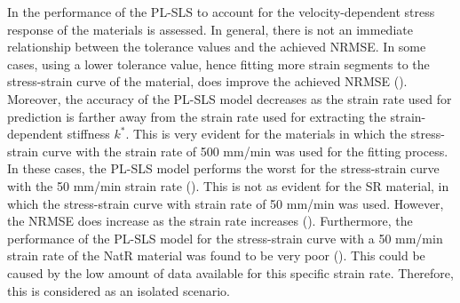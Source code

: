 In  the performance of the PL-SLS to account for the velocity-dependent stress response of the materials is assessed. In general, there is not an immediate relationship between the tolerance values and the achieved NRMSE. In some cases, using a lower tolerance value, hence fitting more strain segments to the stress-strain curve of the material, does improve the achieved NRMSE (). Moreover, the accuracy of the PL-SLS model decreases as the strain rate used for prediction is farther away from the strain rate used for extracting the strain-dependent stiffness $k^*$. This is very evident for the materials in which the stress-strain curve with the strain rate of 500 mm/min was used for the fitting process. In these cases, the PL-SLS model performs the worst for the stress-strain curve with the 50 mm/min strain rate (). This is not as evident for the SR material, in which the stress-strain curve with strain rate of 50 mm/min was used. However, the NRMSE does increase as the strain rate increases (). Furthermore, the performance of the PL-SLS model for the stress-strain curve with a 50 mm/min strain rate of the NatR material was found to be very poor (). This could be caused by the low amount of data available for this specific strain rate. Therefore, this is considered as an isolated scenario.

